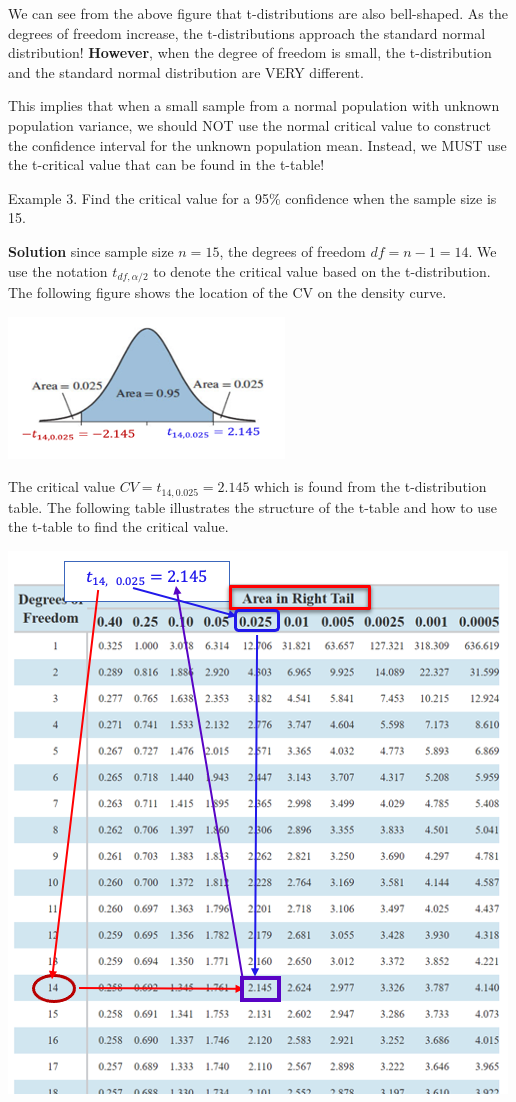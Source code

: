 \documentclass[
]{book}
\begin{document}
We can see from the above figure that t-distributions are also bell-shaped. As the degrees of freedom increase, the t-distributions approach the standard normal distribution! \textbf{However}, when the degree of freedom is small, the t-distribution and the standard normal distribution are VERY different.

This implies that when a small sample from a normal population with unknown population variance, we should NOT use the normal critical value to construct the confidence interval for the unknown population mean. Instead, we MUST use the t-critical value that can be found in the t-table!

Example 3. Find the critical value for a 95\% confidence when the sample size is 15.

\textbf{Solution} since sample size \(n = 15\), the degrees of freedom \(df = n -1 = 14.\) We use the notation \(t_{df, \alpha/2}\) to denote the critical value based on the t-distribution. The following figure shows the location of the CV on the density curve.

\begin{center}\includegraphics[width=0.4\linewidth]{week07/t-CV} \end{center}

The critical value \(CV = t_{14, 0.025} = 2.145\) which is found from the t-distribution table. The following table illustrates the structure of the t-table and how to use the t-table to find the critical value.

\begin{center}\includegraphics[width=0.7\linewidth]{week07/t-Table} \end{center}
\end{document}
